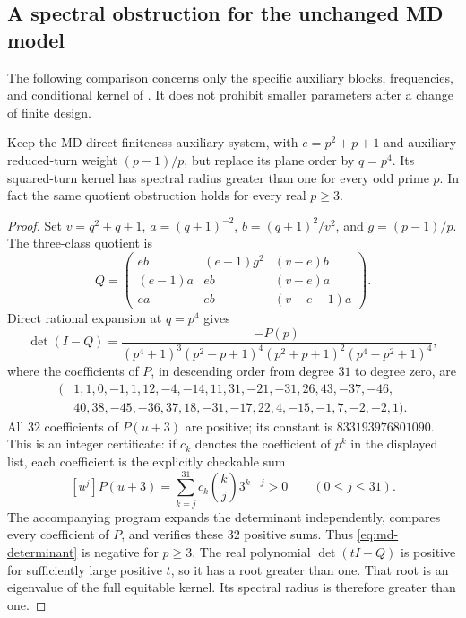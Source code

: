 \subsection{A spectral obstruction for the unchanged MD model}
The following comparison concerns only the specific auxiliary blocks, frequencies, and conditional kernel of \cite[Section~7]{MD26}. It does not prohibit smaller parameters after a change of finite design.
\begin{proposition}\label{prop:md-obstruction}
Keep the MD direct-finiteness auxiliary system, with $e=p^2+p+1$ and auxiliary reduced-turn weight $(p-1)/p$, but replace its plane order by $q=p^4$. Its squared-turn kernel has spectral radius greater than one for every odd prime $p$. In fact the same quotient obstruction holds for every real $p\ge3$.
\end{proposition}
\begin{proof}
Set $v=q^2+q+1$, $a=(q+1)^{-2}$, $b=(q+1)^2/v^2$, and $g=(p-1)/p$. The three-class quotient is
\[
 Q=\begin{pmatrix}
 eb&(e-1)g^2&(v-e)b\\
 (e-1)a&eb&(v-e)a\\
 ea&eb&(v-e-1)a
 \end{pmatrix}.
\]
Direct rational expansion at $q=p^4$ gives
\begin{equation}\label{eq:md-determinant}
 \det(I-Q)=\frac{-P(p)}{(p^4+1)^3(p^2-p+1)^4(p^2+p+1)^2(p^4-p^2+1)^4},
\end{equation}
where the coefficients of $P$, in descending order from degree $31$ to degree zero, are
\[
\begin{split}
 (&1,1,0,-1,1,12,-4,-14,11,31,-21,-31,26,43,-37,-46,\\
  &40,38,-45,-36,37,18,-31,-17,22,4,-15,-1,7,-2,-2,1).
\end{split}
\]
All $32$ coefficients of $P(u+3)$ are positive; its constant is $833193976801090$. This is an integer certificate: if $c_k$ denotes the coefficient of $p^k$ in the displayed list, each coefficient is the explicitly checkable sum
\[
 [u^j]P(u+3)=\sum_{k=j}^{31}c_k\binom{k}{j}3^{k-j}>0
 \qquad(0\le j\le31).
\]
The accompanying program expands the determinant independently, compares every coefficient of $P$, and verifies these $32$ positive sums. Thus \eqref{eq:md-determinant} is negative for $p\ge3$. The real polynomial $\det(tI-Q)$ is positive for sufficiently large positive $t$, so it has a root greater than one. That root is an eigenvalue of the full equitable kernel. Its spectral radius is therefore greater than one.
\end{proof}

